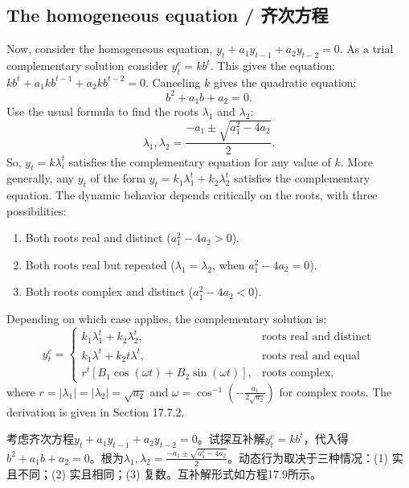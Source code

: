 \subsection{The homogeneous equation / 齐次方程}

\begin{original}
Now, consider the homogeneous equation, $y_t + a_1 y_{t-1} + a_2 y_{t-2} = 0$. As a trial complementary solution consider $y_t^c = k b^t$. This gives the equation: $k b^t + a_1 k b^{t-1} + a_2 k b^{t-2} = 0$. Canceling $k$ gives the quadratic equation:
\[
b^2 + a_1 b + a_2 = 0.
\]
Use the usual formula to find the roots $\lambda_1$ and $\lambda_2$:
\[
\lambda_1, \lambda_2 = \frac{-a_1 \pm \sqrt{a_1^2 - 4a_2}}{2}.
\]
So, $y_t = k \lambda_i^t$ satisfies the complementary equation for any value of $k$. More generally, any $y_t$ of the form $y_t = k_1\lambda_1^t + k_2\lambda_2^t$ satisfies the complementary equation. The dynamic behavior depends critically on the roots, with three possibilities:

\begin{enumerate}
\item Both roots real and distinct ($a_1^2 - 4a_2 > 0$).
\item Both roots real but repeated ($\lambda_1 = \lambda_2$, when $a_1^2 - 4a_2 = 0$).
\item Both roots complex and distinct ($a_1^2 - 4a_2 < 0$).
\end{enumerate}

Depending on which case applies, the complementary solution is:
\[
y_t^c = \begin{cases}
k_1 \lambda_1^t + k_2 \lambda_2^t, & \text{roots real and distinct}\\[4pt]
k_1 \lambda^t + k_2 t \lambda^t, & \text{roots real and equal}\\[4pt]
r^t[B_1 \cos(\omega t) + B_2 \sin(\omega t)], & \text{roots complex},
\end{cases} \tag{17.9}
\]
where $r = |\lambda_1| = |\lambda_2| = \sqrt{a_2}$ and $\omega = \cos^{-1}(-\frac{a_1}{2\sqrt{a_2}})$ for complex roots. The derivation is given in Section 17.7.2.
\end{original}
\begin{translation}
考虑齐次方程$y_t + a_1 y_{t-1} + a_2 y_{t-2} = 0$。试探互补解$y_t^c = k b^t$，代入得$b^2 + a_1 b + a_2 = 0$。根为$\lambda_1, \lambda_2 = \frac{-a_1 \pm \sqrt{a_1^2 - 4a_2}}{2}$。动态行为取决于三种情况：(1) 实且不同；(2) 实且相同；(3) 复数。互补解形式如方程17.9所示。
\end{translation}


